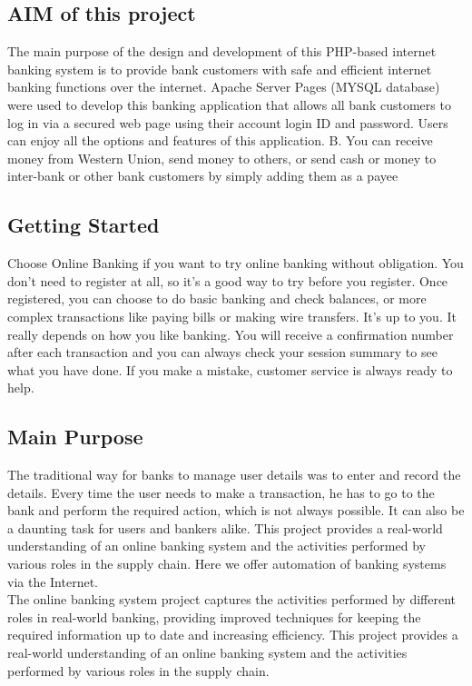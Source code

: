 \documentclass{article}
\begin{document}
\subsection{AIM of this project }
The main purpose of the design and development of this PHP-based internet banking system is to provide bank customers with safe and efficient internet banking functions over the internet. Apache Server Pages (MYSQL database) were used to develop this banking application that allows all bank customers to log in via a secured web page using their account login ID and password. Users can enjoy all the options and features of this application. B. You can receive money from Western Union, send money to others, or send cash or money to inter-bank or other bank customers by simply adding them as a payee
\newpage
\subsection{Getting Started}
Choose Online Banking if you want to try online banking without obligation. You don't need to register at all, so it's a good way to try before you register. Once registered, you can choose to do basic banking and check balances, or more complex transactions like paying bills or making wire transfers. It's up to you. It really depends on how you like banking. You will receive a confirmation number after each transaction and you can always check your session summary to see what you have done. If you make a mistake, customer service is always ready to help.
\newpage
\subsection{Main Purpose }
The traditional way for banks to manage user details was to enter and record the details. Every time the user needs to make a transaction, he has to go to the bank and perform the required action, which is not always possible. It can also be a daunting task for users and bankers alike. This project provides a real-world understanding of an online banking system and the activities performed by various roles in the supply chain. Here we offer automation of banking systems via the Internet.\\ The online banking system project captures the activities performed by different roles in real-world banking, providing improved techniques for keeping the required information up to date and increasing efficiency. This project provides a real-world understanding of an online banking system and the activities performed by various roles in the supply chain.
\newpage
\end{document}
